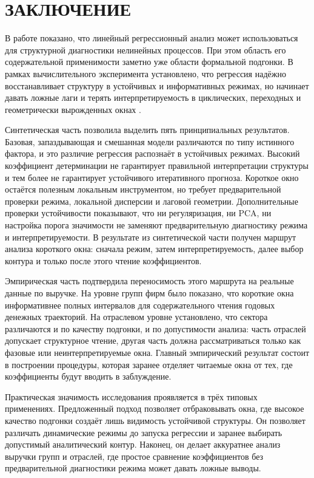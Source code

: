 \chapter*{ЗАКЛЮЧЕНИЕ}
\label{chap:conclusion}

В работе показано, что линейный регрессионный анализ может использоваться для структурной диагностики нелинейных процессов. При этом область его содержательной применимости заметно уже области формальной подгонки. В рамках вычислительного эксперимента установлено, что регрессия надёжно восстанавливает структуру в устойчивых и информативных режимах, но начинает давать ложные лаги и терять интерпретируемость в циклических, переходных и геометрически вырожденных окнах \cite{strogatz,montgomery}.

Синтетическая часть позволила выделить пять принципиальных результатов. Базовая, запаздывающая и смешанная модели различаются по типу истинного фактора, и это различие регрессия распознаёт в устойчивых режимах. Высокий коэффициент детерминации не гарантирует правильной интерпретации структуры и тем более не гарантирует устойчивого итеративного прогноза. Короткое окно остаётся полезным локальным инструментом, но требует предварительной проверки режима, локальной дисперсии и лаговой геометрии. Дополнительные проверки устойчивости показывают, что ни регуляризация, ни PCA, ни настройка порога значимости не заменяют предварительную диагностику режима и интерпретируемости. В результате из синтетической части получен маршрут анализа короткого окна: сначала режим, затем интерпретируемость, далее выбор контура и только после этого чтение коэффициентов.

Эмпирическая часть подтвердила переносимость этого маршрута на реальные данные по выручке. На уровне групп фирм было показано, что короткие окна информативнее полных интервалов для содержательного чтения годовых денежных траекторий. На отраслевом уровне установлено, что сектора различаются и по качеству подгонки, и по допустимости анализа: часть отраслей допускает структурное чтение, другая часть должна рассматриваться только как фазовые или неинтерпретируемые окна. Главный эмпирический результат состоит в построении процедуры, которая заранее отделяет читаемые окна от тех, где коэффициенты будут вводить в заблуждение.

Практическая значимость исследования проявляется в трёх типовых применениях. Предложенный подход позволяет отбраковывать окна, где высокое качество подгонки создаёт лишь видимость устойчивой структуры. Он позволяет различать динамические режимы до запуска регрессии и заранее выбирать допустимый аналитический контур. Наконец, он делает аккуратнее анализ выручки групп и отраслей, где простое сравнение коэффициентов без предварительной диагностики режима может давать ложные выводы.

